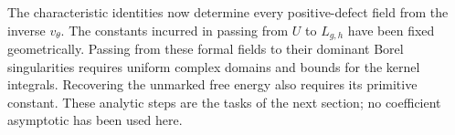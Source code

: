 
The characteristic identities now determine every positive-defect
field from the inverse $v_\theta$. The constants incurred in passing
from $U$ to $L_{g,h}$ have been fixed geometrically. Passing from
these formal fields to their dominant Borel
singularities requires uniform complex domains and bounds for the
kernel integrals. Recovering the unmarked free energy also requires
its primitive constant. These analytic steps are the tasks of the
next section; no coefficient asymptotic has been used here.
